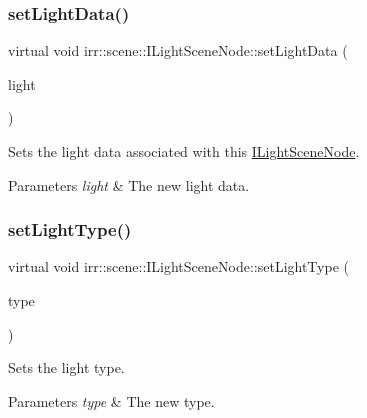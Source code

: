 \subsubsection{\texorpdfstring{set\+Light\+Data()}{setLightData()}\hspace{0.1cm}{\footnotesize\ttfamily [2/2]}}
{\footnotesize\ttfamily virtual void irr\+::scene\+::\+I\+Light\+Scene\+Node\+::set\+Light\+Data (\begin{DoxyParamCaption}\item[{const \hyperlink{structirr_1_1video_1_1SLight}{video\+::\+S\+Light} \&}]{light }\end{DoxyParamCaption})\hspace{0.3cm}{\ttfamily [pure virtual]}}



Sets the light data associated with this \hyperlink{classirr_1_1scene_1_1ILightSceneNode}{I\+Light\+Scene\+Node}. 


\begin{DoxyParams}{Parameters}
{\em light} & The new light data. \\
\hline
\end{DoxyParams}
\mbox{\label{classirr_1_1scene_1_1ILightSceneNode_a18b3c0ba831bdc9166db341a35701c9b}} 
\subsubsection{\texorpdfstring{set\+Light\+Type()}{setLightType()}\hspace{0.1cm}{\footnotesize\ttfamily [1/2]}}
{\footnotesize\ttfamily virtual void irr\+::scene\+::\+I\+Light\+Scene\+Node\+::set\+Light\+Type (\begin{DoxyParamCaption}\item[{\hyperlink{namespaceirr_1_1video_aaf0e02f6f83cc35cf9e764bf18400d39}{video\+::\+E\+\_\+\+L\+I\+G\+H\+T\+\_\+\+T\+Y\+PE}}]{type }\end{DoxyParamCaption})\hspace{0.3cm}{\ttfamily [pure virtual]}}



Sets the light type. 


\begin{DoxyParams}{Parameters}
{\em type} & The new type. \\
\hline
\end{DoxyParams}
\mbox{\label{classirr_1_1scene_1_1ILightSceneNode_a18b3c0ba831bdc9166db341a35701c9b}} 
